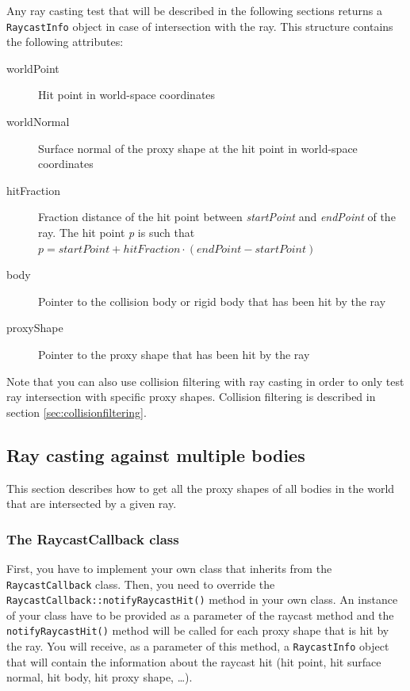 \documentclass[a4paper,12pt]{article}
\begin{document}
    \vspace{0.6cm}

    Any ray casting test that will be described in the following sections returns a \texttt{RaycastInfo} object in case of intersection with the ray.
    This structure contains the following attributes: \\

    \begin{description}
         \item[worldPoint] Hit point in world-space coordinates
         \item[worldNormal] Surface normal of the proxy shape at the hit point in world-space coordinates
         \item[hitFraction] Fraction distance of the hit point between \emph{startPoint}  and \emph{endPoint} of the ray. The hit point \emph{p} is such that
           $p = startPoint + hitFraction \cdot (endPoint - startPoint)$
         \item[body] Pointer to the collision body or rigid body that has been hit by the ray
         \item[proxyShape] Pointer to the proxy shape that has been hit by the ray
    \end{description}

    Note that you can also use collision filtering with ray casting in order to only test ray intersection with specific proxy shapes.
    Collision filtering is described in section \ref{sec:collisionfiltering}.

    \subsection{Ray casting against multiple bodies}

    This section describes how to get all the proxy shapes of all bodies in the world that are intersected by a given ray.

    \subsubsection{The RaycastCallback class}

    First, you have to implement your own class that inherits from the \texttt{RaycastCallback} class. Then, you need to override the
    \texttt{RaycastCallback::notifyRaycastHit()} method in your own class. An instance of your class have to be provided as a parameter
    of the raycast method and the \texttt{notifyRaycastHit()} method will be called for each proxy shape that is hit by the ray. You will receive, as a parameter
    of this method, a \texttt{RaycastInfo} object that will contain the information about the raycast hit (hit point, hit surface normal, hit body, hit proxy shape, \dots). \\
\end{document}
